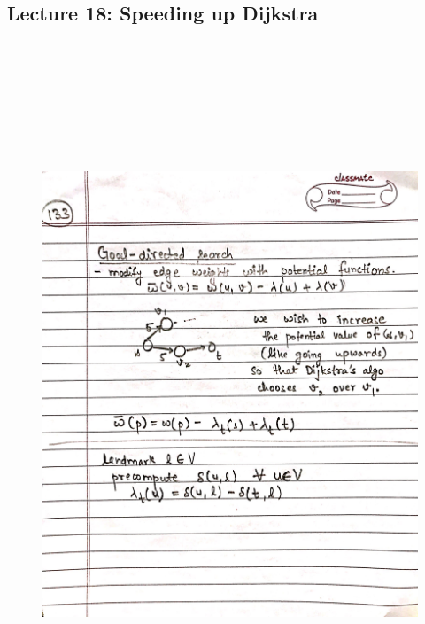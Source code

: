 \newpage
{\color{black} \subsection*{Lecture 18: Speeding up Dijkstra}}
\begin{figure}[H]
    \centering
    \includegraphics[width=16cm, height=21cm]{"./MIT-6.006/MIT-6006-133"}
\end{figure}
